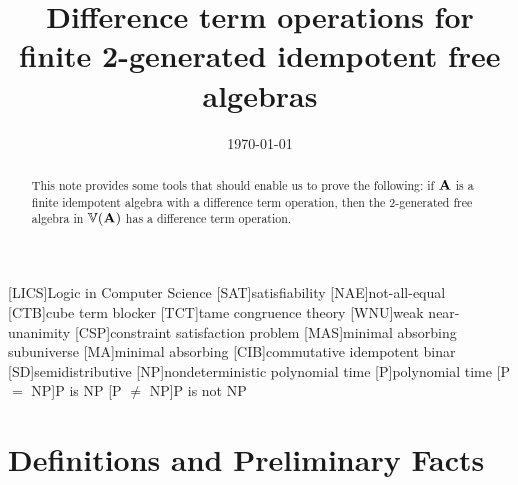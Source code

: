 [LICS]{Logic in Computer Science}
[SAT]{satisfiability}
[NAE]{not-all-equal}
[CTB]{cube term blocker}
[TCT]{tame congruence theory}
[WNU]{weak near-unanimity}
[CSP]{constraint satisfaction problem}
[MAS]{minimal absorbing subuniverse}
[MA]{minimal absorbing}
[CIB]{commutative idempotent binar}
[SD]{semidistributive}
[NP]{nondeterministic polynomial time}
[P]{polynomial time}
[P $ = $ NP]{P is NP}
[P $ \neq $ NP]{P is not NP}





\usepackage{inputs/macros}



\title[Difference Term Operation for $\bF_{\sV}(2)$]
{Difference term operations for finite 2-generated idempotent free algebras}
\date{\today}
\address{University of Hawaii}


\begin{abstract}
This note provides some tools that should enable us to prove
the following: if $\mathbf{A}$ is a finite idempotent algebra with a
difference term operation, then the 2-generated free algebra in $\operatorname{\mathbb{V}}(\mathbf{A})$ has
a difference term operation.  
\end{abstract}

\maketitle

\renewcommand{\etaR}{\ensuremath{\eta}}


\section{Definitions and Preliminary Facts}
\label{sec:facts}

